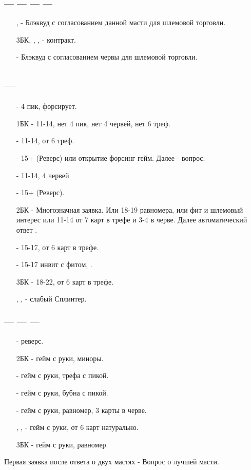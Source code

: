 \documentclass{article}
\begin{document}
\subsubsection{ ---  ---  ---  --- }
\begin{enumerate}
    \item[\cl{4}, \di{4}] - Блэквуд с согласованием данной масти для шлемовой торговли.
    \item[3БК, \he{4}, \cl{5}, \di{5}] - контракт.
    \item[\sp{4}] - Блэквуд с согласованием червы для шлемовой торговли.
\end{enumerate}
\subsection{ --- }
\begin{enumerate}
    \item[\sp{1}] - 4 пик, форсирует.
    \item[1БК] - 11-14, нет 4 пик, нет 4 червей, нет 6 треф.
    \item[\cl{2}] - 11-14, от 6 треф.
    \item[\di{2}] - 15+  (Реверс) или открытие форсинг гейм. Далее  - вопрос.
    \item[\he{2}] - 11-14, 4 червей
    \item[\sp{2}] - 15+  (Реверс).
    \item[2БК] - Многозначная заявка. Или 18-19 равномера, или фит и шлемовый интерес или 11-14 от 7 карт в трефе и 3-4 в черве. Далее автоматический ответ .
    \item[\cl{3}] - 15-17, от 6 карт в трефе.
    \item[\he{3}] - 15-17 инвит с фитом, .
    \item[3БК] - 18-22, от 6 карт в трефе.
    \item[\sp{3}, \cl{4}, \di{4}] - слабый Сплинтер.
\end{enumerate}
\subsubsection{ ---  ---  --- }
\begin{enumerate}
    \item[\sp{2}] - реверс.
    \item[2БК] - гейм с руки, миноры.
    \item[\cl{3}] - гейм с руки, трефа с пикой.
    \item[\di{3}] - гейм с руки, бубна с пикой.
    \item[\he{3}] - гейм с руки, равномер, 3 карты в черве.
    \item[\sp{3}, \cl{4}, \di{4}] - гейм с руки, от 6 карт натурально.
    \item[3БК] - гейм с руки, равномер.
\end{enumerate}
Первая заявка после ответа о двух мастях - Вопрос о лучшей масти. 
\end{document}
